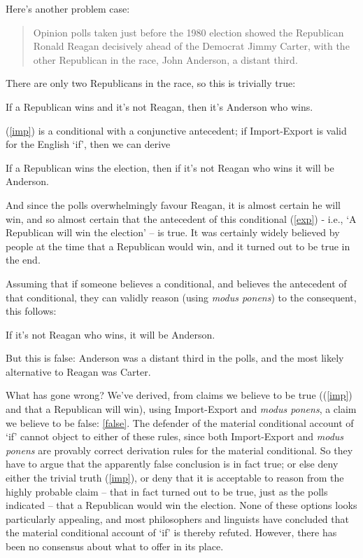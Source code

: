 Here's another problem case: \begin{quote}
	Opinion polls taken just before the 1980 election showed the Republican Ronald Reagan decisively ahead of the Democrat Jimmy Carter, with the other Republican in the race, John Anderson, a distant third.  \citep{mcgee}
\end{quote} There are only two Republicans in the race, so this is trivially true: \begin{exe}
	\ex If a Republican wins and it's not Reagan, then it's Anderson who wins.\label{imp}
\end{exe} (\ref{imp}) is a conditional with a conjunctive antecedent; if Import-Export is valid for the English `if', then we can derive \begin{exe}
	\ex If a Republican wins the election, then if it’s not Reagan who wins it will be Anderson.\label{exp}
\end{exe}
And since the polls overwhelmingly favour Reagan, it is almost certain he will win, and so almost certain that the antecedent of this conditional (\ref{exp}) - i.e., `A Republican will win the election' – is true. It was certainly widely believed by people at the time that a Republican would win, and it turned out to be true in the end.

Assuming that if someone believes a conditional, and believes the antecedent of that conditional, they can validly reason (using \emph{modus ponens}) to the consequent, this follows: \begin{exe}
	\ex If it's not Reagan who wins, it will be Anderson.\label{false}
\end{exe}
But this is false: Anderson was a distant third in the polls, and the most likely alternative to Reagan was Carter. 


What has gone wrong? We've derived, from claims we believe to be true ((\ref{imp}) and that a Republican will win), using Import-Export and \emph{modus ponens}, a claim we believe to be false: \ref{false}. The defender of the material conditional account of `if' cannot object to either of these rules, since both Import-Export and \emph{modus ponens} are provably correct derivation rules for the material conditional. So they have to argue that the apparently false conclusion is in fact true; or else deny either the trivial truth (\ref{imp}), or deny that it is acceptable to reason from the highly probable claim – that in fact turned out to be true, just as the polls indicated – that a Republican would win the election. None of these options looks particularly appealing, and most philosophers and linguists have concluded that the material conditional account of `if' is thereby refuted. However, there has been no consensus about what to offer in its place. 




